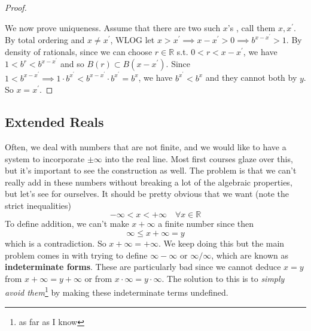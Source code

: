 \begin{proof}
\begin{enumerate}
    \end{enumerate}
    We now prove uniqueness. Assume that there are two such $x$'s , call them $x, x^\prime$. By total ordering and $x \neq x^\prime$, WLOG let $x > x^\prime \implies x - x^\prime > 0 \implies b^{x - x^\prime} > 1$. By density of rationals, since we can choose $r \in \mathbb{R}$ s.t. $0 < r < x - x^\prime$, we have $1 < b^r < b^{x - x^\prime}$ and so $B(r) \subset B(x - x^\prime)$. Since $1 < b^{x - x^\prime} \implies 1 \cdot b^{x^\prime} < b^{x - x^\prime} \cdot b^{x^\prime} = b^x$, we have $b^{x^\prime} < b^x$ and they cannot both by $y$. So $x = x^\prime$. 
  \end{proof}

\subsection{Extended Reals} 

  Often, we deal with numbers that are not finite, and we would like to have a system to incorporate $\pm \infty$ into the real line. Most first courses glaze over this, but it's important to see the construction as well. The problem is that we can't really add in these numbers without breaking a lot of the algebraic properties, but let's see for ourselves. It should be pretty obvious that we want (note the strict inequalities)
  \begin{equation}
    -\infty < x < +\infty \quad \forall x \in \mathbb{R}
  \end{equation} 
  To define addition, we can't make $x + \infty$ a finite number since then 
  \begin{equation}
    \infty \leq x + \infty = y 
  \end{equation}
  which is a contradiction. So $x + \infty = +\infty$. We keep doing this but the main problem comes in with trying to define $\infty - \infty$ or $\infty/\infty$, which are known as \textbf{indeterminate forms}. These are particularly bad since we cannot deduce $x = y$ from $x + \infty = y + \infty$ or from $x \cdot \infty = y \cdot \infty$. The solution to this is to \textit{simply avoid them}\footnote{as far as I know} by making these indeterminate terms undefined. 

